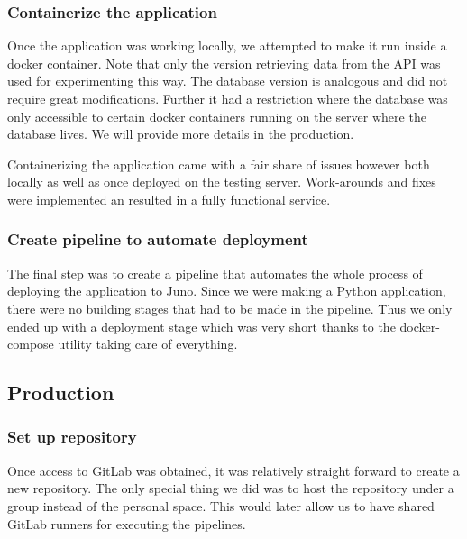\subsubsection{Containerize the application}

Once the application was working locally, we attempted to make it run
inside a docker container. Note that only the version retrieving data
from the API was used for experimenting this way. The database version
is analogous and did not require great modifications. Further it had a
restriction where the database was only accessible to certain docker
containers running on the server where the database lives. We will
provide more details in the production.

Containerizing the application came with a fair share of issues
however both locally as well as once deployed on the testing server.
Work-arounds and fixes were implemented an resulted in a fully
functional service.

\subsubsection{Create pipeline to automate deployment}

The final step was to create a pipeline that automates the whole
process of deploying the application to Juno. Since we were making a
Python application, there were no building stages that had to be made
in the pipeline. Thus we only ended up with a deployment stage which
was very short thanks to the docker-compose utility taking care of
everything.


\subsection{Production}





\subsubsection{Set up repository}

Once access to GitLab was obtained, it was relatively straight forward
to create a new repository. The only special thing we did was to host
the repository under a group instead of the personal space. This would
later allow us to have shared GitLab runners for executing the
pipelines.

